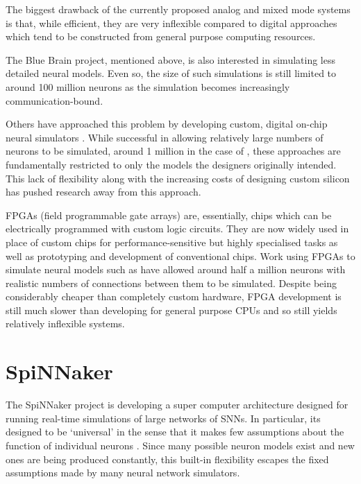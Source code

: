 			The biggest drawback of the currently proposed analog and mixed mode
			systems is that, while efficient, they are very inflexible compared to
			digital approaches which tend to be constructed from general purpose
			computing resources.
			
			The Blue Brain project, mentioned above, is also interested in simulating
			less detailed neural models. Even so, the size of such simulations is
			still limited to around 100 million neurons \cite{markram06} as the
			simulation becomes increasingly communication-bound.
			
			Others have approached this problem by developing custom, digital on-chip
			neural simulators \cite{prange93,jahnke96,schoenauer99,mehrtash03}. While
			successful in allowing relatively large numbers of neurons to be
			simulated, around 1 million in the case of \cite{mehrtash03}, these
			approaches are fundamentally restricted to only the models the designers
			originally intended. This lack of flexibility along with the increasing
			costs of designing custom silicon has pushed research away from this
			approach.
			
			FPGAs (field programmable gate arrays) are, essentially, chips which can
			be electrically programmed with custom logic circuits. They are now widely
			used in place of custom chips for performance-sensitive but highly
			specialised tasks as well as prototyping and development of conventional
			chips. Work using FPGAs to simulate neural models such as
			\cite{hellmich05} have allowed around half a million neurons with
			realistic numbers of connections between them to be simulated. Despite
			being considerably cheaper than completely custom hardware, FPGA
			development is still much slower than developing for general purpose CPUs
			and so still yields relatively inflexible systems.
	
	
	\section{SpiNNaker}
		
		
		The SpiNNaker project is developing a super computer architecture designed
		for running real-time simulations of large networks of SNNs. In particular,
		its designed to be `universal' in the sense that it makes few assumptions
		about the function of individual neurons \cite{furber06}. Since many
		possible neuron models exist and new ones are being produced constantly,
		this built-in flexibility escapes the fixed assumptions made by many neural
		network simulators\cite{furber07}.
		
